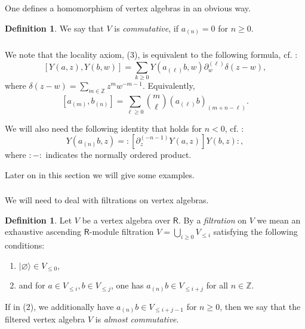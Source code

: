 \documentclass{amsart}
\theoremstyle{definition}
\newtheorem{defi}[Thm]{Definition}
\newcommand{\sss}{\subsubsection{}}
\newcommand{\Ring}{\mathsf{R}}
\newcommand{\Z}{\mathbb{Z}}
\numberwithin{equation}{section}
\begin{document}
One defines a homomorphism of vertex algebras in an obvious way. 


\begin{defi}\label{defi:vertex_commutative}
We say that $V$ is {\it commutative}, if $a_{(n)}=0$ for $n\geqslant 0$.
\end{defi}

\sss
We note that the locality axiom, (3), is equivalent to the following formula, cf. \cite[(2.3-7)]{Frenkel_loop}:
\begin{equation}\label{eq:Y_bracket}
[Y(a,z),Y(b,w)]=\sum_{k\geqslant 0}Y(a_{(\ell)}b,w)\partial_w^{(\ell)}\delta(z-w),
\end{equation}
where $\delta(z-w)=\sum_{m\in \Z} z^mw^{-m-1}$. Equivalently, 
\begin{equation}\label{eq:VA_modes_brackets}
[a_{(m)},b_{(n)}]=\sum_{\ell\geqslant 0}{m\choose \ell}(a_{(\ell)}b)_{(m+n-\ell)}.
\end{equation}

We will also need the following identity that holds for $n<0$, cf. \cite[(2.3-4)]{Frenkel_loop}:
\begin{equation}\label{eq:Y_product}
Y(a_{(n)}b,z)=:[\partial_z^{(-n-1)}Y(a,z)]Y(b,z):,
\end{equation}
where $:-:$ indicates the normally ordered product. 

Later on in this section we will give some examples. 

\sss\label{SSS_vertex_filtration}
We will need to deal with filtrations on vertex algebras. 

\begin{defi}
Let $V$ be a vertex algebra over $\Ring$. By a {\it filtration} on $V$ we mean an exhaustive ascending $\Ring$-module filtration $V=\bigcup_{i\geqslant 0}V_{\leqslant i}$ satisfying the following conditions:
\begin{enumerate}
\item $| \varnothing \rangle\in V_{\leqslant 0}$,
\item and for $a\in V_{\leqslant i}, b\in V_{\leqslant j}$, one has $a_{(n)}b\in V_{\leqslant i+j}$ for all $n\in \Z$. 
\end{enumerate}
If in (2), we additionally have $a_{(n)}b\in V_{\leqslant i+j-1}$
for $n\geqslant 0$, then we say that the filtered vertex algebra $V$ is {\it almost commutative}. 
\end{defi}
\end{document}
